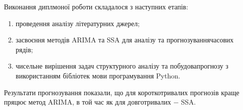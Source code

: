\label{sec:Summary}

\hspace*{26pt} Виконання диплмоної роботи складалося з наступних етапів:

\begin{enumerate}
	\item проведення аналізу літературних джерел;
	\item засвоєння методів ARIMA та SSA для аналізу та прогнозування\newline \hspace*{-18mm}часових рядів;
	\item чисельне вирішення задач структурного аналізу та побудова\newline \hspace*{-18mm}прогнозу з використанням бібліотек мови програмування Python.
\end{enumerate}

Результати прогнозування показали, що для короткотривалих прогнозів краще пряцює метод ARIMA, в той час як для довготривалих $-$ SSA.